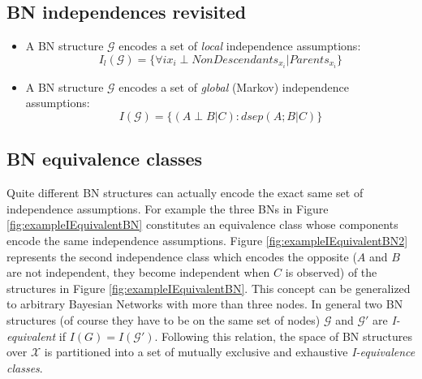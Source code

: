 \subsection{BN independences revisited}
\begin{itemize}
	\item A BN structure $\mathcal{G}$ encodes a set of \textit{local}
		independence assumptions:
		\[
			I_{l}(\mathcal{G}) = \{\forall i x_{i}\perp \mathit{NonDescendants}_{x_i}|
			\mathit{Parents}_{x_i}\}
		\]

	\item A BN structure $\mathcal{G}$ encodes a set of \textit{global} (Markov)
		independence assumptions:
		\[
			I(\mathcal{G}) = \{(A \perp B | C) : \mathit{dsep}(A;B|C)\}
		\]
\end{itemize}

\subsection{BN equivalence classes}
Quite different BN structures can actually encode the exact same set of
independence assumptions. For example the three BNs in Figure \ref{fig:exampleIEquivalentBN}
constitutes an equivalence class whose components encode the same independence assumptions.
Figure \ref{fig:exampleIEquivalentBN2} represents the second independence class
which encodes the opposite ($A$ and $B$ are not independent, they become
independent when $C$ is observed) of the structures in Figure \ref{fig:exampleIEquivalentBN}.
This concept can be generalized to arbitrary Bayesian Networks with more than
three nodes. In general two BN structures (of course they have to be on the same
set of nodes) $\mathcal{G}$ and $\mathcal{G}'$ are \textit{I-equivalent} if
$I(G)=I(\mathcal{G}')$. Following this relation, the space of BN structures over
$\mathcal{X}$ is partitioned into a set of mutually exclusive and exhaustive
\textit{I-equivalence classes}.

